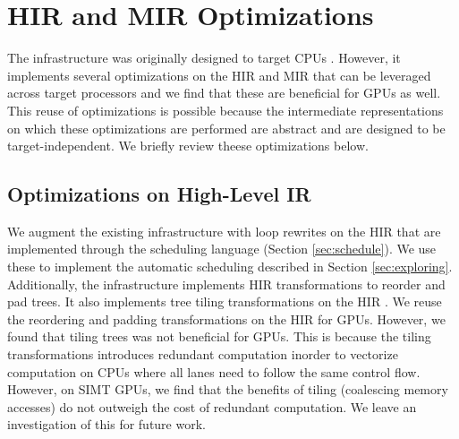 \section{HIR and MIR Optimizations}


The \Treebeard{} infrastructure was originally designed to target CPUs \cite{Treebeard}. 
However, it implements several optimizations on the HIR and MIR that 
can be leveraged across target processors and we find that these 
are beneficial for GPUs as well. This reuse of optimizations is possible 
because the intermediate representations on which these optimizations are performed 
are abstract and are designed to be target-independent. We briefly review theese 
optimizations below. 

\subsection{Optimizations on High-Level IR}
We augment the existing \Treebeard{} infrastructure with loop rewrites on 
the HIR that are implemented through the scheduling language (Section \ref{sec:schedule}).
We use these to implement the automatic scheduling described in Section \ref{sec:exploring}. 
Additionally, the \Treebeard{} infrastructure implements HIR transformations to reorder and pad 
trees. It also implements tree tiling transformations on the HIR \cite{Treebeard}. We reuse the 
reordering and padding transformations on the HIR for GPUs. However, we found that 
tiling trees was not beneficial for GPUs. This is because the tiling transformations
introduces redundant computation inorder to vectorize computation on CPUs where 
all lanes need to follow the same control flow. However, on SIMT GPUs, we find that 
the benefits of tiling (coalescing memory accesses) do not outweigh the cost of
redundant computation. We leave an investigation of this for future work.

